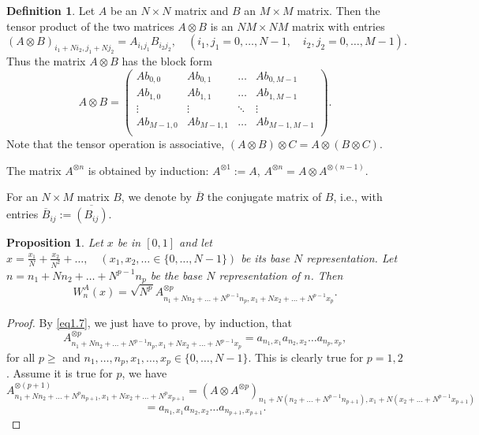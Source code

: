 \documentclass[11pt]{amsart}
\newtheorem{proposition}[theorem]{Proposition}
\theoremstyle{definition}
\newtheorem{definition}[theorem]{Definition}
\theoremstyle{remark}
\numberwithin{equation}{section}
\newcommand{\cj}[1]{\overline{#1}}
\begin{document}
\begin{definition}\label{deftensor}
Let $A$ be an $N\times N$ matrix and $B$ an $M\times M$ matrix. Then the tensor product of the two matrices $A\otimes B$ is an $NM\times NM$ matrix with entries
$$(A\otimes B)_{i_1+Ni_2,j_1+N j_2}=A_{i_1j_1}B_{i_2j_2},\quad(i_1,j_1=0,\dots,N-1,\quad i_2,j_2=0,\dots,M-1).$$
Thus the matrix $A\otimes B$ has the block form
$$A\otimes B=\begin{pmatrix}
	Ab_{0,0}&Ab_{0,1}&\dots &Ab_{0,M-1}\\
	Ab_{1,0}&Ab_{1,1}&\dots &Ab_{1,M-1}\\
	\vdots&\vdots&\ddots&\vdots\\
	Ab_{M-1,0}&Ab_{M-1,1}&\dots &Ab_{M-1,M-1}\\
\end{pmatrix}.$$
Note that the tensor operation is associative, $(A\otimes B)\otimes C=A\otimes (B\otimes C)$.


The matrix $A^{\otimes n}$ is obtained by induction: $A^{\otimes 1}:=A$, $A^{\otimes n}=A\otimes A^{\otimes (n-1)}$.

For an $N\times M$ matrix $B$, we denote by $\cj B$ the conjugate matrix of $B$, i.e., with entries $\cj B_{ij}:=\cj {(B_{ij})}$.
\end{definition}


\begin{proposition}\label{pr1.2.1}
Let $x$ be in $[0,1]$ and let
$
x=\frac{x_1}{N}+\frac{x_2}{N^2}+\dots,\quad (x_1,x_2,\dots\in\{0,\dots,N-1\})
$ be its base $N$ representation. Let $n=n_1+Nn_2+\dots +N^{p-1}n_p$ be the base $N$ representation of $n$. Then
\begin{equation}
W_n^A(x)=\sqrt{N^p}A^{\otimes p}_{n_1+Nn_2+\dots+N^{p-1}n_{p}, x_1+Nx_2+\dots+N^{p-1}x_{p}}.
\label{eq1.2.1.1}
\end{equation}

\end{proposition}

\begin{proof}
By \eqref{eq1.7}, we just have to prove, by induction, that
\begin{equation}
A^{\otimes p}_{n_1+Nn_2+\dots+N^{p-1}n_{p}, x_1+Nx_2+\dots+N^{p-1}x_{p}}=a_{n_1,x_1}a_{n_2,x_2}\dots a_{n_p,x_p},
\label{eq1.2.1.2}
\end{equation}
for all $p\geq$ and $n_1,\dots,n_p,x_1,\dots,x_p\in\{0,\dots,N-1\}$. This is clearly true for $p=1,2$. Assume it is true for $p$, we have
$$A^{\otimes (p+1)}_{n_1+Nn_2+\dots+N^{p}n_{p+1},x_1+Nx_2+\dots+N^px_{p+1}}=(A\otimes A^{\otimes p})_{n_1+N(n_2+\dots+N^{p-1}n_{p+1}),x_1+N(x_2+\dots+N^{p-1}x_{p+1})}$$$$=a_{n_1,x_1}a_{n_2,x_2}\dots a_{n_{p+1},x_{p+1}}.$$
\end{proof}
\end{document}
